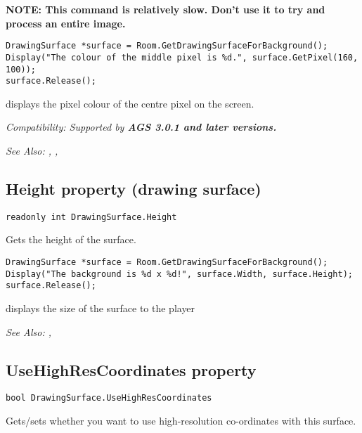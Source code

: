 \bf{NOTE:} This command is relatively slow. Don't use it to try and process an entire image.

\begin{verbatim}
DrawingSurface *surface = Room.GetDrawingSurfaceForBackground();
Display("The colour of the middle pixel is %d.", surface.GetPixel(160, 100));
surface.Release();
\end{verbatim}
displays the pixel colour of the centre pixel on the screen.

\it{Compatibility:} Supported by \bf{AGS 3.0.1} and later versions.

\it{See Also:} ,
,


\subsection{Height property (drawing surface)}\label{DrawingSurface.Height}%

\begin{verbatim}
readonly int DrawingSurface.Height
\end{verbatim}
Gets the height of the surface.

\begin{verbatim}
DrawingSurface *surface = Room.GetDrawingSurfaceForBackground();
Display("The background is %d x %d!", surface.Width, surface.Height);
surface.Release();
\end{verbatim}
displays the size of the surface to the player

\it{See Also:} ,


\subsection{UseHighResCoordinates property}\label{DrawingSurface.UseHighResCoordinates}%

\begin{verbatim}
bool DrawingSurface.UseHighResCoordinates
\end{verbatim}
Gets/sets whether you want to use high-resolution co-ordinates with this surface.


